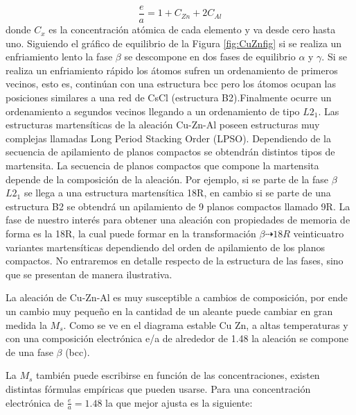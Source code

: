 \documentclass[a4paper,12pt,fleqn,twoside,openany]{book}
\begin{document}
\begin{equation}
\frac{e}{a} = 1+C_{Zn}+2C_{Al}
\end{equation}
donde $C_{x}$ es la concentración atómica de cada elemento y va desde cero hasta uno. 
Siguiendo el gráfico de equilibrio de la Figura \ref{fig:CuZnfig} si se realiza 
un enfriamiento lento la fase $\beta$ se descompone en dos fases de equilibrio $\alpha$ y $\gamma$. Si se realiza un enfriamiento rápido los átomos sufren un ordenamiento de primeros vecinos, esto es, continúan con una estructura bcc pero los átomos ocupan las posiciones similares a una red de CsCl (estructura B2).Finalmente ocurre un ordenamiento a segundos vecinos llegando a un ordenamiento de tipo $L2_1$. Las estructuras martensíticas de la aleación Cu-Zn-Al 
poseen estructuras muy complejas llamadas Long Period Stacking Order (LPSO). Dependiendo de la secuencia de apilamiento de planos 
compactos se obtendrán distintos tipos de martensita. La secuencia de planos compactos que compone la martensita depende de la composición de la 
aleación. Por ejemplo, si se parte de la fase $\beta$ $L2_1$ se llega a una estructura martensítica 18R, en cambio si se parte de una estructura B2 se 
obtendrá un apilamiento de 9 planos compactos llamado 9R. La fase de nuestro interés para obtener una aleación con propiedades de memoria de forma 
es la 18R, la cual puede formar en la transformación $\beta \dashrightarrow 18R$ veinticuatro variantes martensíticas dependiendo del orden de apilamiento 
de los planos compactos. No entraremos en detalle respecto de la estructura de las fases, sino que se presentan de manera ilustrativa.


La aleación de Cu-Zn-Al es muy susceptible a cambios de composición, por ende un cambio muy pequeño en la cantidad de un aleante puede cambiar en gran medida la $M_s$. 
Como se ve en el diagrama estable Cu Zn, a altas temperaturas y con una composición electrónica e/a de alrededor de 1.48 la aleación se compone de una fase $\beta$ (bcc). 

La $M_{s}$ también puede escribirse en función de las concentraciones, existen 
distintas fórmulas empíricas que pueden usarse. Para una concentración electrónica de $\frac{e}{a}=1.48$ la que mejor ajusta es la siguiente:
\end{document}
